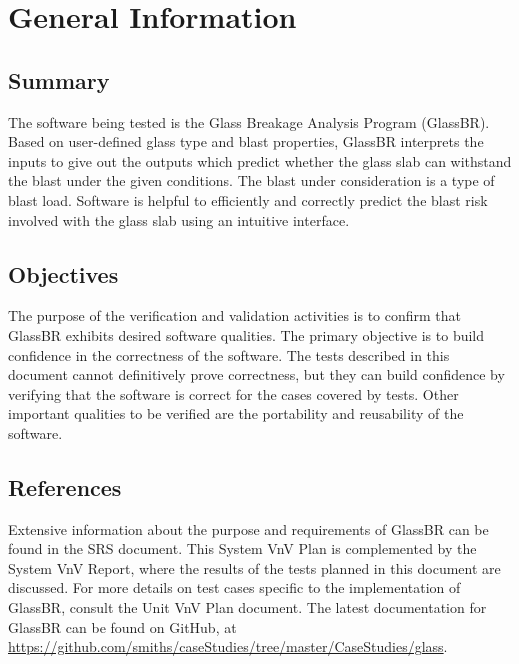 \documentclass[12pt, titlepage]{article}
\newcommand{\progname}{GlassBR}
\begin{document}
\section{General Information} \label{sec_GenInfo}

\subsection{Summary}

\noindent The software being tested is the Glass Breakage Analysis Program 
(\progname{}). Based on user-defined glass type and blast properties,
\progname{} interprets the inputs to give out the outputs which
predict whether the glass slab can withstand the blast under the given conditions. The blast under
consideration is a type of  blast load. Software is helpful to efficiently and correctly
predict the blast risk involved with the glass slab using an intuitive interface.

\subsection{Objectives}

\noindent The purpose of the verification and validation activities is to 
confirm that \progname{} exhibits desired software qualities. The primary 
objective is to build confidence in the correctness of the software. The tests 
described in this document cannot definitively prove correctness, but they can 
build confidence by verifying that the software is correct for the cases 
covered by tests. Other important qualities to be verified are the 
portability and reusability of the software.

\subsection{References}

\noindent Extensive information about the purpose and requirements of
\progname{} can be found in the SRS document. This System VnV Plan is
complemented by the System VnV Report, where the results of the tests planned in
this document are discussed. For more details on test cases specific to the
implementation of \progname{}, consult the Unit VnV Plan document. The latest
documentation for \progname{} can be found on GitHub, at \newline
\href{https://github.com/smiths/caseStudies/tree/master/CaseStudies/glass}
{https://github.com/smiths/caseStudies/tree/master/CaseStudies/glass}. 
\end{document}
